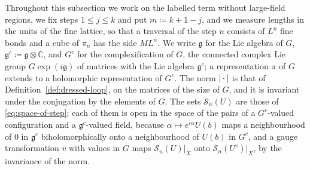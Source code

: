 \documentclass[11pt]{preprint}
\DeclarePairedDelimiter{\abs}{\lvert}{\rvert}
\numberwithin{equation}{section}
\theoremstyle{definition}
\theoremstyle{remark}
\theoremstyle{plain}
\begin{document}
Throughout this subsection we work on the labelled term without large-field regions, we fix steps $1 \leq j \leq k$ and put $m \coloneqq k + 1 - j$, and we measure lengths in the units of the fine lattice, so that a traversal of the step $n$ consists of $L^n$ fine bonds and a cube of $\pi_n$ has the side $ML^n$. We write $\mathfrak g$ for the Lie algebra of $G$, $\mathfrak g^c \coloneqq \mathfrak g \otimes \mathbb C$, and $G^c$ for the complexification of $G$, the connected complex Lie group $G\exp(i\mathfrak g)$ of matrices with the Lie algebra $\mathfrak g^c$; a representation $\pi$ of $G$ extends to a holomorphic representation of $G^c$. The norm $\abs{\,\cdot\,}$ is that of Definition~\ref{def:dressed-loop}, on the matrices of the size of $G$, and it is invariant under the conjugation by the elements of $G$. The sets $\mathcal S_n(U)$ are those of \eqref{eq:space-of-step}; each of them is open in the space of the pairs of a $G^c$-valued configuration and a $\mathfrak g^c$-valued field, because $\alpha \mapsto e^{i\alpha}U(b)$ maps a neighbourhood of $0$ in $\mathfrak g^c$ biholomorphically onto a neighbourhood of $U(b)$ in $G^c$, and a gauge transformation $v$ with values in $G$ maps $\mathcal S_n(U)|_X$ onto $\mathcal S_n(U^v)|_X$, by the invariance of the norm.
\end{document}
